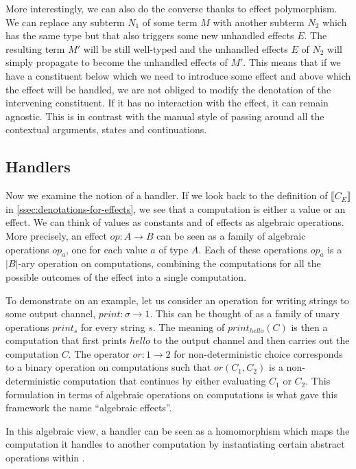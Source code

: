 \documentclass[a4paper,11pt]{easychair}
\newcommand{\sem}[1]{\llbracket #1 \rrbracket}
\begin{document}
More interestingly, we can also do the converse thanks to effect
polymorphism. We can replace any subterm $N_1$ of some term $M$ with another
subterm $N_2$ which has the same type but that also triggers some new
unhandled effects $E$. The resulting term $M'$ will be still well-typed and
the unhandled effects $E$ of $N_2$ will simply propagate to become the
unhandled effects of $M'$. This means that if we have a constituent below
which we need to introduce some effect and above which the effect will be
handled, we are not obliged to modify the denotation of the intervening
constituent. If it has no interaction with the effect, it can remain
agnostic. This is in contrast with the manual style of passing around all the
contextual arguments, states and continuations.

\subsection{Handlers}

Now we examine the notion of a handler. If we look back to the definition of
$\sem{C_E}$ in \ref{ssec:denotations-for-effects}, we see that a computation
is either a value or an effect. We can think of values as constants and of
effects as algebraic operations. More precisely, an effect $op : A \to B$ can
be seen as a family of algebraic operations $op_a$, one for each value $a$ of
type $A$. Each of these operations $op_a$ is a $\left| B \right|$-ary
operation on computations, combining the computations for all the possible
outcomes of the effect into a single computation.

To demonstrate on an example, let us consider an operation for writing strings
to some output channel, $print : \sigma \to 1$. This can be thought of as a
family of unary operations $print_s$ for every string $s$. The meaning of
$print_{hello}(C)$ is then a computation that first prints $hello$ to the
output channel and then carries out the computation $C$. The operator $or : 1
\to 2$ for non-deterministic choice corresponds to a binary operation on
computations such that $or(C_1, C_2)$ is a non-deterministic computation that
continues by either evaluating $C_1$ or $C_2$. This formulation in terms of
algebraic operations on computations is what gave this framework the name
``algebraic effects''.

In this algebraic view, a handler can be seen as a homomorphism which maps the
computation it handles to another computation by instantiating certain
abstract operations within \citep{plotkin2009handlers}
\citep{pretnar2010logic}.
\end{document}
